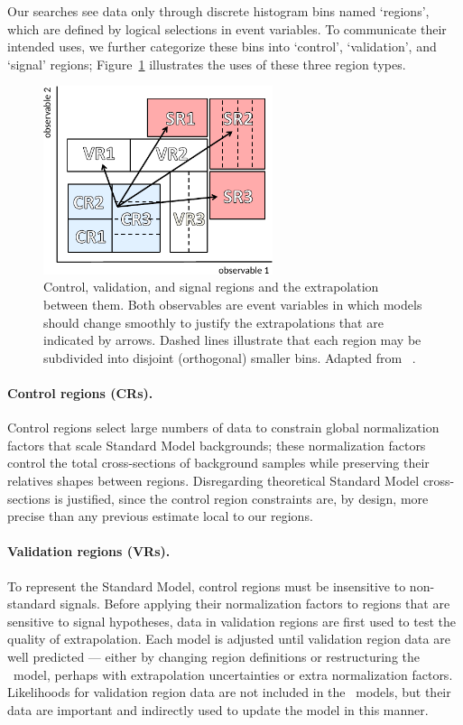 Our searches see data only through discrete histogram bins named `regions',
which are defined by logical selections in event variables.
To communicate their intended uses, we further categorize these bins into
`control', `validation', and `signal' regions;
Figure~\ref{fig:searches_histfitter_regions} illustrates the uses of these
three region types.

\begin{figure}[tp]
\centering
\includegraphics[width=0.6\textwidth]{figures/searches_histfitter_regions.pdf}
\caption[
Control, validation, and signal regions
]{%
Control, validation, and signal regions and the extrapolation between them.
Both observables are event variables in which models should change
smoothly to justify the extrapolations that are indicated by arrows.
Dashed lines illustrate that each region may be subdivided into
disjoint (orthogonal) smaller bins.
Adapted from \histfitter~\cite{baak2015histfitter}.
}
\label{fig:searches_histfitter_regions}
\end{figure}

\paragraph{Control regions (CRs).}
Control regions select large numbers of data to constrain global normalization
factors that scale Standard Model backgrounds;
these normalization factors control the total cross-sections of
background samples while preserving their relatives shapes between regions.
Disregarding theoretical Standard Model cross-sections is justified, since
the control region constraints are, by design, more precise than any previous
estimate local to our regions.

\paragraph{Validation regions (VRs).}
To represent the Standard Model, control regions must be insensitive to
non-standard signals.
Before applying their normalization factors to regions that are sensitive
to signal hypotheses, data in validation regions are first used to test the
quality of extrapolation.
Each model is adjusted until validation region data are well predicted ---
either by changing region definitions or restructuring the \heplikelihood\
model, perhaps with extrapolation uncertainties or extra normalization
factors.
Likelihoods for validation region data are not included in the \heplikelihood\
models, but their data are important and indirectly used to update the
model in this manner.

